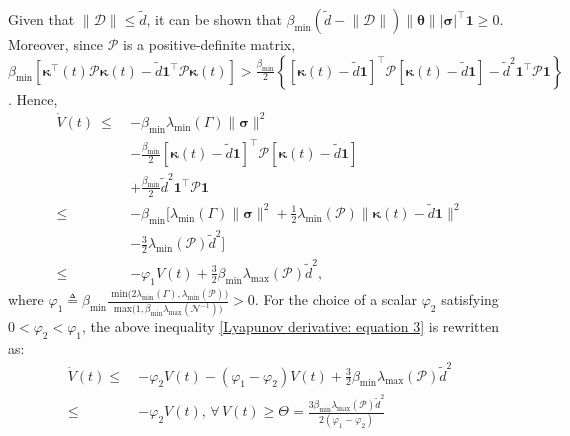 \documentclass[lettersize,journal]{IEEEtran}
\begin{document}
Given that $\lVert\mathcal{D}\rVert \leq \tilde{d}$, it can be shown that $\beta_{\min} \left( \tilde{d} - \lVert\mathcal{D}\rVert \right) \lVert \boldsymbol{\theta} \rVert \lvert \boldsymbol{\sigma} \rvert^{\top} \boldsymbol{1} \geq 0$.
Moreover, since $\mathcal{P}$ is a positive-definite matrix, $\beta_{\min} \left[\boldsymbol{\kappa}^{\top}(t) \mathcal{P} \boldsymbol{\kappa}(t) - \tilde{d} \boldsymbol{1}^{\top} \mathcal{P} \boldsymbol{\kappa}(t) \right] > \frac{\beta_{\min}}{2} \left\{\left[\boldsymbol{\kappa}(t) - \tilde{d} \boldsymbol{1}\right]^{\top} \mathcal{P} \left[\boldsymbol{\kappa}(t) - \tilde{d} \boldsymbol{1}\right] - \tilde{d}^2 \boldsymbol{1}^{\top} \mathcal{P} \boldsymbol{1} \right\}$.
Hence,
\begin{align}
\label{Lyapunov derivative: equation 3}
\dot{V}(t) ~ \leq ~ &-\beta_{\min}\lambda_{\min}(\Gamma) \lVert \boldsymbol{\sigma} \rVert^2 \nonumber\\
& - \frac{\beta_{\min} }{2}\left[\boldsymbol{\kappa}(t) - \tilde{d} \boldsymbol{1}\right]^{\top} \mathcal{P} \left[\boldsymbol{\kappa}(t) - \tilde{d} \boldsymbol{1}\right] \nonumber\\
& +\frac{\beta_{\min} }{2}\tilde{d}^2 \boldsymbol{1}^{\top} \mathcal{P} \boldsymbol{1} \nonumber \\
\leq ~ &-\beta_{\min} \Big[ \lambda_{\min}(\Gamma) \lVert \boldsymbol{\sigma} \rVert^2 + \frac{1}{2}\lambda_{\min}(\mathcal{P}) \lVert \boldsymbol{\kappa}(t) - \tilde{d} \boldsymbol{1} \rVert^2 \nonumber\\
& - \frac{3}{2} \lambda_{\min}(\mathcal{P}) \tilde{d}^2 \Big] \nonumber \\
\leq~ &-\varphi_1 V(t) + \frac{3}{2} \beta_{\min} \lambda_{\max}(\mathcal{P}) \tilde{d}^2,
\end{align}
where $\varphi_1 \triangleq \beta_{\min} \frac{\text{ min}\big(2 \lambda_{\min}\left(\Gamma \right),\lambda_{\min}\left(\mathcal{P} \right)\big)}{\text{max}\big(1,\beta_{\min} \lambda_{\max}\left(\mathcal{N}^{-1} \right)\big)}>0$.
For the choice of a scalar $\varphi_2$ satisfying $0<\varphi_2<\varphi_1$, the above inequality \eqref{Lyapunov derivative: equation 3} is rewritten as:
\begin{align}
\label{Lyapunov derivative: equation 4}
\dot{V}(t)\leq~&-\varphi_2 V(t)-(\varphi_1-\varphi_2) V(t) + \frac{3}{2} \beta_{\min} \lambda_{\max}(\mathcal{P}) \tilde{d}^2 \nonumber\\
\leq ~&-\varphi_2 V(t), \, \forall\, V(t)\geq \Theta=\frac{3 \beta_{\min} \lambda_{\max}(\mathcal{P}) \tilde{d}^2}{2(\varphi_1-\varphi_2)}
\end{align}
\end{document}
